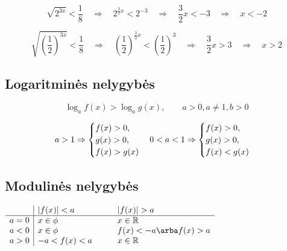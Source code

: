 \begin{equation}
    \sqrt{2^{3x}} < \frac{1}{8} \quad\Rightarrow\quad
    2^{\frac{3}{2}x} < 2^{-3} \quad\Rightarrow\quad
    \frac{3}{2}x < -3 \quad\Rightarrow\quad
    x < -2
\end{equation}

\begin{equation}
    \sqrt{{(\frac{1}{2})}^{3x}} < \frac{1}{8} \quad\Rightarrow\quad
    {(\frac{1}{2})}^{\frac{3}{2}x} < {(\frac{1}{2})}^{3} \quad\Rightarrow\quad
    \frac{3}{2}x > 3 \quad\Rightarrow\quad
    x > 2
\end{equation}

\subsection{Logaritminės nelygybės}

\begin{equation}
    \log_a f(x) > \log_a g(x), \qquad a > 0, a \ne 1, b > 0
\end{equation}

\begin{equation}
    a > 1 \Rightarrow 
    \begin{cases}
        f(x) > 0, \\
        g(x) > 0, \\
        f(x) > g(x)
    \end{cases} \\
    0 < a < 1 \Rightarrow 
    \begin{cases}
        f(x) > 0, \\
        g(x) > 0, \\
        f(x) < g(x)
    \end{cases}  
\end{equation}

\subsection{Modulinės nelygybės}
\begin{center}
    $
    \begin{array}{ l | l l }
              & |f(x)| < a    \qquad & |f(x)| > a               \\
        \hline                                                  
        a = 0 & x \in \phi    \qquad & x \in \mathbb{R}         \\
        a < 0 & x \in \phi    \qquad & f(x) < -a \arba f(x) > a \\
        a > 0 & -a < f(x) < a \qquad & x \in \mathbb{R}         \\
    \end{array}
    $
\end{center}

